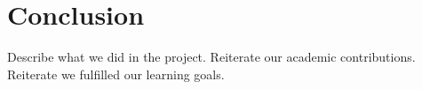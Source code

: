 \chapter{Conclusion}

Describe what we did in the project. Reiterate our academic
contributions. Reiterate we fulfilled our learning goals.


